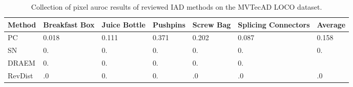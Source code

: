 \begin{table}[htbp]
    \tiny
    \centering
    \begin{tabularx}{\textwidth}{|X|X|X|X|X|X|X|}%
        \hline
        \textbf{Method} & \textbf{Breakfast Box} & \textbf{Juice Bottle} & \textbf{Pushpins} & \textbf{Screw Bag} & \textbf{Splicing Connectors} & \textbf{Average} \\
        \hline
        PC \cite{patchCore2022} & 0.018 & 0.111 & 0.371 & 0.202 & 0.087 & 0.158 \\
        \hline 
        SN \cite{liu2023simplenet} & 0. & 0. & 0. & 0. & 0. & 0. \\
        \hline
        DRAEM \cite{Zavrtanik_2021DRAEM} & 0. & 0. & 0. & 0. & 0. &  \\
        \hline
        RevDist \cite{revdist2023} & .0 & 0. & 0. & .0 & .0 & .0 \\
        \hline
    \end{tabularx}
    \caption{Collection of pixel auroc results of reviewed IAD methods on the MVTecAD LOCO \cite{LOCODentsAndScratchesBergmann2022} dataset.}
    \label{tab:sproloco}
\end{table}


